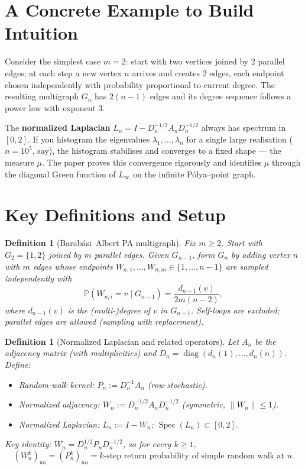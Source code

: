 \documentclass[11pt,a4paper]{article}
\newtheorem{definition}[theorem]{Definition}
\begin{document}
\section{A Concrete Example to Build Intuition}

Consider the simplest case $m=2$: start with two vertices joined by 2 parallel edges; at each step a new vertex $n$ arrives and creates 2 edges, each endpoint chosen independently with probability proportional to current degree. The resulting multigraph $G_n$ has $2(n-1)$ edges and its degree sequence follows a power law with exponent $3$.

The \textbf{normalized Laplacian} $L_n = I - D_n^{-1/2}A_n D_n^{-1/2}$ always has spectrum in $[0,2]$. If you histogram the eigenvalues $\lambda_1,\dots,\lambda_n$ for a single large realisation ($n=10^5$, say), the histogram stabilises and converges to a fixed shape --- the measure $\mu$. The paper proves this convergence rigorously and identifies $\mu$ through the diagonal Green function of $L_\infty$ on the infinite P\'olya--point graph.

\section{Key Definitions and Setup}

\begin{definition}[Barab\'asi--Albert PA multigraph]
Fix $m\ge 2$. Start with $G_2 = \{1,2\}$ joined by $m$ parallel edges. Given $G_{n-1}$, form $G_n$ by adding vertex $n$ with $m$ edges whose endpoints $W_{n,1},\dots,W_{n,m}\in\{1,\dots,n-1\}$ are sampled \emph{independently} with
\[
  \mathbb{P}(W_{n,i}=v\mid G_{n-1}) = \frac{d_{n-1}(v)}{2m(n-2)},
\]
where $d_{n-1}(v)$ is the (multi-)degree of $v$ in $G_{n-1}$. Self-loops are excluded; parallel edges are allowed (sampling with replacement).
\end{definition}

\begin{definition}[Normalized Laplacian and related operators]
Let $A_n$ be the adjacency matrix (with multiplicities) and $D_n = \operatorname{diag}(d_n(1),\dots,d_n(n))$. Define:
\begin{itemize}
  \item Random-walk kernel: $P_n := D_n^{-1}A_n$ (row-stochastic).
  \item Normalized adjacency: $W_n := D_n^{-1/2}A_n D_n^{-1/2}$ (symmetric, $\|W_n\|\le 1$).
  \item Normalized Laplacian: $L_n := I - W_n$; $\operatorname{Spec}(L_n)\subset[0,2]$.
\end{itemize}
Key identity: $W_n = D_n^{1/2}P_n D_n^{-1/2}$, so for every $k\ge 1$,
\[
  (W_n^k)_{uu} = (P_n^k)_{uu} = \text{$k$-step return probability of simple random walk at $u$}.
\]
\end{definition}
\end{document}
